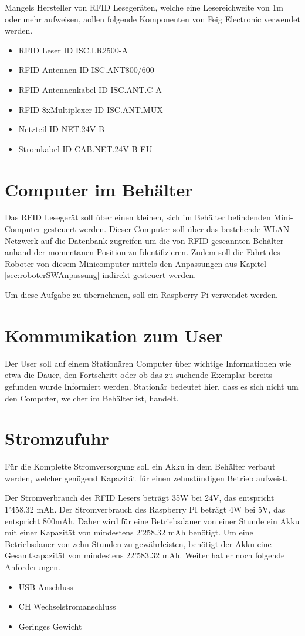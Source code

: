 Mangels Hersteller von RFID Lesegeräten, welche eine Lesereichweite von 1m oder mehr aufweisen, aollen folgende Komponenten von Feig Electronic verwendet werden. 
\begin{itemize}
	\item RFID Leser ID ISC.LR2500-A
	\item RFID Antennen ID ISC.ANT800/600
	\item RFID Antennenkabel ID ISC.ANT.C-A
	\item RFID 8xMultiplexer ID ISC.ANT.MUX
	\item Netzteil ID NET.24V-B
	\item Stromkabel ID CAB.NET.24V-B-EU
\end{itemize}

\clearpage
\section{Computer im Behälter}
Das RFID Lesegerät soll über einen kleinen, sich im Behälter befindenden Mini-Computer gesteuert werden. Dieser Computer soll über das bestehende WLAN Netzwerk auf die Datenbank zugreifen um die von RFID gescannten Behälter anhand der momentanen Position zu Identifizieren.  
Zudem soll die Fahrt des Roboter von diesem Minicomputer mittels den Anpassungen aus Kapitel  \ref{sec:roboterSWAnpassung} indirekt gesteuert werden.

Um diese Aufgabe zu übernehmen, soll ein Raspberry Pi verwendet werden.

\section{Kommunikation zum User}
Der User soll auf einem Stationären Computer über wichtige Informationen wie etwa die Dauer, den Fortschritt oder ob das zu suchende Exemplar bereits gefunden wurde Informiert werden. Stationär bedeutet hier, dass es sich nicht um den Computer, welcher im Behälter ist, handelt.

\section{Stromzufuhr}
Für die Komplette Stromversorgung soll ein Akku in dem Behälter verbaut werden, welcher genügend Kapazität für einen zehnstündigen Betrieb aufweist.

Der Stromverbrauch des RFID Lesers beträgt 35W bei 24V, das entspricht 1'458.32 mAh.
Der Stromverbrauch des Raspberry PI beträgt 4W bei 5V, das entspricht 800mAh.
Daher wird für eine Betriebsdauer von einer Stunde ein Akku mit einer Kapazität von mindestens 2'258.32 mAh benötigt. Um eine Betriebsdauer von zehn Stunden zu gewährleisten, benötigt der Akku eine Gesamtkapazität von mindestens 22'583.32 mAh.
Weiter hat er noch folgende Anforderungen.
\begin{itemize}
	\item USB Anschluss
	\item CH Wechselstromanschluss
	\item Geringes Gewicht
\end{itemize}

